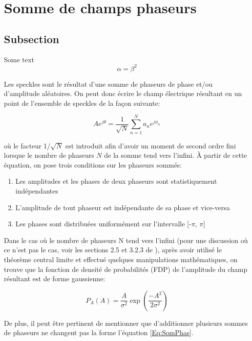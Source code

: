 \documentclass{article}       %
\begin{document}
\section{Somme de champs phaseurs}

\subsection{Subsection}
Some text
\begin{equation}
\label{eq1} \alpha = \beta^2
\end{equation}

Les speckles sont le résultat d'une somme de phaseurs de phase et/ou d'amplitude aléatoires. On peut donc écrire le champ électrique résultant en un point de l'ensemble de speckles de la façon suivante:

\begin{equation}
A e^{j\theta} = \frac{1}{\sqrt{N}}\sum_{n=1}^{N}a_{n}e^{j\phi_{n}}
\end{equation}

où le facteur 1/$\sqrt{N}$ est introduit afin d'avoir un moment de second ordre fini lorsque le nombre de phaseurs $N$ de la somme tend vers l'infini. À partir de cette équation, on pose trois conditions sur les phaseurs sommés:\\
\begin{enumerate}
    \item Les amplitudes et les phases de deux phaseurs sont statistiquement indépendantes
    \item L'amplitude de tout phaseur est indépendante de sa phase et vice-versa
    \item Les phases sont distribuées uniformément sur l'intervalle [-$\pi$, $\pi$]
\end{enumerate}
\bigskip

Dans le cas où le nombre de phaseurs N tend vers l'infini (pour une discussion où ce n'est pas le cas, voir les sections 2.5 et 3.2.3 de \cite{Manuel}), après avoir utilisé le théorème central limite et effectué quelques manipulations mathématiques, on trouve que la fonction de densité de probabilités (FDP) de l'amplitude du champ résultant est de forme gaussienne:

\begin{equation}
\label{Eq:FDPAmp}
    P_{A}(A) = \frac{A}{\sigma^2}\exp\left(\frac{-A^2}{2\sigma^2}\right)
\end{equation}

De plus, il peut être pertinent de mentionner que d'additionner plusieurs sommes de phaseurs ne changent pas la forme l'équation \ref{Eq:SomPhas}.\\
\end{document}
